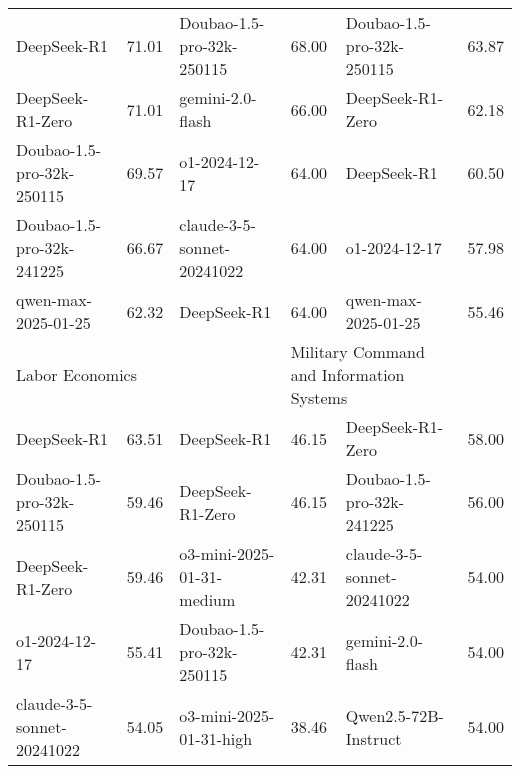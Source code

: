 {\begin{longtable}{p{4.2cm}>{\centering\arraybackslash} p{0.8cm}|p{4.2cm} >{\centering\arraybackslash} p{0.8cm}|p{4.2cm} >{\centering\arraybackslash} p{0.8cm}}
\cellcolor{pink!5} DeepSeek-R1 & \cellcolor{pink!2}71.01 & \cellcolor{blue!5} Doubao-1.5-pro-32k-250115 & \cellcolor{blue!2} 68.00 & \cellcolor{yellow!5} Doubao-1.5-pro-32k-250115 & \cellcolor{yellow!2} 63.87\\
\cellcolor{pink!5} DeepSeek-R1-Zero & \cellcolor{pink!2}71.01 & \cellcolor{blue!5} gemini-2.0-flash & \cellcolor{blue!2} 66.00 & \cellcolor{yellow!5} DeepSeek-R1-Zero & \cellcolor{yellow!2} 62.18\\
\cellcolor{pink!5} Doubao-1.5-pro-32k-250115 & \cellcolor{pink!2}69.57 & \cellcolor{blue!5} o1-2024-12-17 & \cellcolor{blue!2} 64.00 & \cellcolor{yellow!5} DeepSeek-R1 & \cellcolor{yellow!2} 60.50\\
\cellcolor{pink!5} Doubao-1.5-pro-32k-241225 & \cellcolor{pink!2}66.67 & \cellcolor{blue!5} claude-3-5-sonnet-20241022 & \cellcolor{blue!2} 64.00 & \cellcolor{yellow!5} o1-2024-12-17 & \cellcolor{yellow!2} 57.98\\
\cellcolor{pink!5} qwen-max-2025-01-25 & \cellcolor{pink!2}62.32 & \cellcolor{blue!5} DeepSeek-R1 & \cellcolor{blue!2} 64.00 & \cellcolor{yellow!5} qwen-max-2025-01-25 & \cellcolor{yellow!2} 55.46\\
\hline
\multicolumn{2}{p{5.15cm}|}{\cellcolor{pink!10} \centering Labor Economics} & \multicolumn{2}{p{5.15cm}|}{\cellcolor{blue!10} \centering Power Machinery and Engineering} & \multicolumn{2}{p{5.15cm}}{\cellcolor{magenta!10} \centering Military Command and Information Systems}\\
\hline
\cellcolor{pink!5} DeepSeek-R1 & \cellcolor{pink!2}63.51 & \cellcolor{blue!5} DeepSeek-R1 & \cellcolor{blue!2} 46.15 & \cellcolor{magenta!5} DeepSeek-R1-Zero & \cellcolor{magenta!2} 58.00\\
\cellcolor{pink!5} Doubao-1.5-pro-32k-250115 & \cellcolor{pink!2}59.46 & \cellcolor{blue!5} DeepSeek-R1-Zero & \cellcolor{blue!2} 46.15 & \cellcolor{magenta!5} Doubao-1.5-pro-32k-241225 & \cellcolor{magenta!2} 56.00\\
\cellcolor{pink!5} DeepSeek-R1-Zero & \cellcolor{pink!2}59.46 & \cellcolor{blue!5} o3-mini-2025-01-31-medium & \cellcolor{blue!2} 42.31 & \cellcolor{magenta!5} claude-3-5-sonnet-20241022 & \cellcolor{magenta!2} 54.00\\
\cellcolor{pink!5} o1-2024-12-17 & \cellcolor{pink!2}55.41 & \cellcolor{blue!5} Doubao-1.5-pro-32k-250115 & \cellcolor{blue!2} 42.31 & \cellcolor{magenta!5} gemini-2.0-flash & \cellcolor{magenta!2} 54.00\\
\cellcolor{pink!5} claude-3-5-sonnet-20241022 & \cellcolor{pink!2}54.05 & \cellcolor{blue!5} o3-mini-2025-01-31-high & \cellcolor{blue!2} 38.46 & \cellcolor{magenta!5} Qwen2.5-72B-Instruct & \cellcolor{magenta!2} 54.00\\

\end{longtable}}
